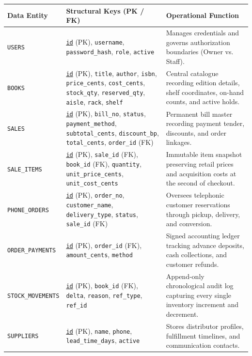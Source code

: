 \documentclass[12pt, a4paper]{report}
\begin{document}
\begin{table}[H]
\centering
\footnotesize
\begin{tabularx}{\textwidth}{L{3.2cm} L{5.8cm} L{6.2cm}}
\toprule
\textbf{Data Entity} & \textbf{Structural Keys (PK / FK)} & \textbf{Operational Function} \\
\midrule
\texttt{USERS} & \underline{\texttt{id}} (PK), \texttt{username}, \texttt{password\_hash}, \texttt{role}, \texttt{active} & Manages credentials and governs authorization boundaries (Owner vs. Staff). \\
\texttt{BOOKS} & \underline{\texttt{id}} (PK), \texttt{title}, \texttt{author}, \texttt{isbn}, \texttt{price\_cents}, \texttt{cost\_cents}, \texttt{stock\_qty}, \texttt{reserved\_qty}, \texttt{aisle}, \texttt{rack}, \texttt{shelf} & Central catalogue recording edition details, shelf coordinates, on-hand counts, and active holds. \\
\texttt{SALES} & \underline{\texttt{id}} (PK), \texttt{bill\_no}, \texttt{status}, \texttt{payment\_method}, \texttt{subtotal\_cents}, \texttt{discount\_bp}, \texttt{total\_cents}, \texttt{order\_id} (FK) & Permanent bill master recording payment tender, discounts, and order linkages. \\
\texttt{SALE\_ITEMS} & \underline{\texttt{id}} (PK), \texttt{sale\_id} (FK), \texttt{book\_id} (FK), \texttt{quantity}, \texttt{unit\_price\_cents}, \texttt{unit\_cost\_cents} & Immutable item snapshot preserving retail prices and acquisition costs at the second of checkout. \\
\texttt{PHONE\_ORDERS} & \underline{\texttt{id}} (PK), \texttt{order\_no}, \texttt{customer\_name}, \texttt{delivery\_type}, \texttt{status}, \texttt{sale\_id} (FK) & Oversees telephonic customer reservations through pickup, delivery, and conversion. \\
\texttt{ORDER\_PAYMENTS}& \underline{\texttt{id}} (PK), \texttt{order\_id} (FK), \texttt{amount\_cents}, \texttt{method} & Signed accounting ledger tracking advance deposits, cash collections, and customer refunds. \\
\texttt{STOCK\_MOVEMENTS}& \underline{\texttt{id}} (PK), \texttt{book\_id} (FK), \texttt{delta}, \texttt{reason}, \texttt{ref\_type}, \texttt{ref\_id} & Append-only chronological audit log capturing every single inventory increment and decrement. \\
\texttt{SUPPLIERS} & \underline{\texttt{id}} (PK), \texttt{name}, \texttt{phone}, \texttt{lead\_time\_days}, \texttt{active} & Stores distributor profiles, fulfillment timelines, and communication contacts. \\

\end{tabularx}
\end{table}
\end{document}
